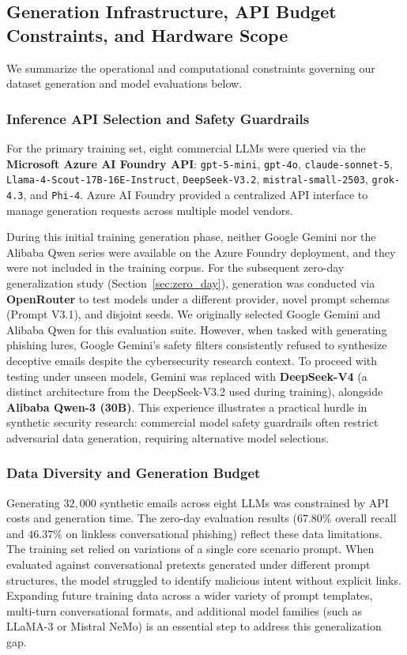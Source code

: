 \documentclass[journal]{IEEEtran}
\begin{document}
\subsection{Generation Infrastructure, API Budget Constraints, and Hardware Scope}
We summarize the operational and computational constraints governing our dataset generation and model evaluations below.

\subsubsection{Inference API Selection and Safety Guardrails}
For the primary training set, eight commercial LLMs were queried via the \textbf{Microsoft Azure AI Foundry API}: \texttt{gpt-5-mini}, \texttt{gpt-4o}, \texttt{claude-sonnet-5}, \texttt{Llama-4-Scout-17B-16E-Instruct}, \texttt{DeepSeek-V3.2}, \texttt{mistral-small-2503}, \texttt{grok-4.3}, and \texttt{Phi-4}. Azure AI Foundry provided a centralized API interface to manage generation requests across multiple model vendors.

During this initial training generation phase, neither Google Gemini \cite{gemini2023team} nor the Alibaba Qwen series were available on the Azure Foundry deployment, and they were not included in the training corpus. For the subsequent zero-day generalization study (Section~\ref{sec:zero_day}), generation was conducted via \textbf{OpenRouter} to test models under a different provider, novel prompt schemas (Prompt V3.1), and disjoint seeds. We originally selected Google Gemini and Alibaba Qwen for this evaluation suite. However, when tasked with generating phishing lures, Google Gemini's safety filters consistently refused to synthesize deceptive emails despite the cybersecurity research context. To proceed with testing under unseen models, Gemini was replaced with \textbf{DeepSeek-V4} (a distinct architecture from the DeepSeek-V3.2 used during training), alongside \textbf{Alibaba Qwen-3 (30B)}. This experience illustrates a practical hurdle in synthetic security research: commercial model safety guardrails often restrict adversarial data generation, requiring alternative model selections.

\subsubsection{Data Diversity and Generation Budget}
Generating $32{,}000$ synthetic emails across eight LLMs was constrained by API costs and generation time. The zero-day evaluation results ($67.80\%$ overall recall and $46.37\%$ on linkless conversational phishing) reflect these data limitations. The training set relied on variations of a single core scenario prompt. When evaluated against conversational pretexts generated under different prompt structures, the model struggled to identify malicious intent without explicit links. Expanding future training data across a wider variety of prompt templates, multi-turn conversational formats, and additional model families (such as LLaMA-3 or Mistral NeMo) is an essential step to address this generalization gap.
\end{document}
